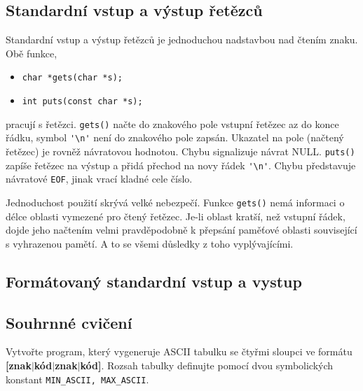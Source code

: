     \subsection{Standardní vstup a výstup řetězců}
      Standardní vstup a výstup řetězců je jednoduchou nadstavbou nad čtením znaku. Obě funkce,
      \begin{itemize}
        \item \lstinline[style=luaCStyle]!char *gets(char *s);!
        \item \lstinline[style=luaCStyle]!int puts(const char *s);!
      \end{itemize}
      pracují s řetězci. \texttt{gets()} načte do znakového pole vstupní řetězec az do konce řádku, 
      symbol  \lstinline[style=luaCStyle]!'\n'! není do znakového pole zapsán. Ukazatel na 
      pole (načtený řetězec) je rovněž návratovou hodnotou. Chybu signalizuje návrat NULL. 
      \texttt{puts()} 
      zapíše řetězec na výstup a přidá přechod na novy řádek       
      \lstinline[style=luaCStyle]!'\n'!. Chybu představuje návratové \texttt{EOF}, jinak vrací 
      kladné cele číslo.
  
      Jednoduchost použití skrývá velké nebezpečí. Funkce \texttt{gets()} nemá informaci o délce 
      oblasti vymezené pro čtený řetězec. Je-li oblast kratší, než vstupní řádek, dojde jeho 
      načtením velmi pravděpodobně k přepsání paměťové oblasti související s vyhrazenou pamětí. A 
      to se všemi důsledky z toho vyplývajícími.
  
    \subsection{Formátovaný standardní vstup a vystup}
    \subsection{Souhrnné cvičení}
      \begin{example}Vytvořte program, který vygeneruje ASCII tabulku se čtyřmi sloupci ve formátu
      \textbf{[znak\(\lvert\)kód\(\lvert\)znak\(\lvert\)kód]}. Rozsah tabulky definujte pomocí dvou
      symbolických konstant \lstinline[style=luaCStyle]!MIN_ASCII, MAX_ASCII!. 
  
        
      \end{example} 

